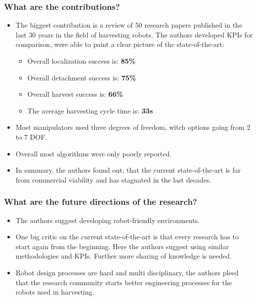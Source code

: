     \subsubsection*{What are the contributions?}
    \begin{itemize}
        \item The biggest contribution is a review of 50 research papers published in the last 30 years in the field of harvesting robots. The authors developed KPIs for comparison, were able to paint a clear picture of the state-of-the-art: \ \begin{itemize}
            \item Overall localization success is: \textbf{85\%}
            \item Overall detachment success is: \textbf{75\%}
            \item Overall harvest success is: \textbf{66\%}
            \item The average harvesting cycle time is: \textbf{33s}
        \end{itemize}
        \item Most manipulators used three degrees of freedom, witch options going from 2 to 7 DOF.
        \item Overall most algorithms were only poorly reported.
        \item In summary, the authors found out, that the current state-of-the-art is far from commercial viability and has stagnated in the last decades. 
    \end{itemize}
    \subsubsection*{What are the future directions of the research?}
    \begin{itemize}
        \item The authors suggest developing robot-friendly environments.
        \item One big critic on the current state-of-the-art is that every research has to start again from the beginning. Here the authors suggest using similar methodologies and KPIs. Further more sharing of knowledge is needed.
        \item Robot design processes are hard and multi disciplinary, the authors pleed that the research community starts better engineering processes for the robots used in harvesting. 
    \end{itemize}
